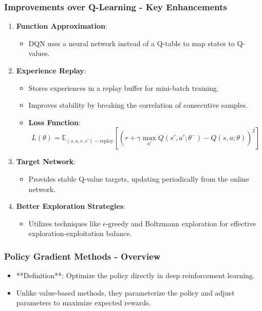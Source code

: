 \documentclass[aspectratio=169]{beamer}
\begin{document}
\begin{frame}[fragile]
    \frametitle{Improvements over Q-Learning - Key Enhancements}
    \begin{enumerate}
        \item \textbf{Function Approximation}:
            \begin{itemize}
                \item DQN uses a neural network instead of a Q-table to map states to Q-values.
            \end{itemize}

        \item \textbf{Experience Replay}:
            \begin{itemize}
                \item Stores experiences in a replay buffer for mini-batch training.
                \item Improves stability by breaking the correlation of consecutive samples.
                \item \textbf{Loss Function}:
                \begin{equation}
                    L(\theta) = \mathbb{E}_{(s, a, r, s') \sim \text{replay}} \left[ (r + \gamma \max_{a'} Q(s', a'; \theta^{-}) - Q(s, a; \theta))^2 \right]
                \end{equation}
            \end{itemize}

        \item \textbf{Target Network}:
            \begin{itemize}
                \item Provides stable Q-value targets, updating periodically from the online network.
            \end{itemize}

        \item \textbf{Better Exploration Strategies}:
            \begin{itemize}
                \item Utilizes techniques like $\epsilon$-greedy and Boltzmann exploration for effective exploration-exploitation balance.
            \end{itemize}
    \end{enumerate}
\end{frame}

\begin{frame}[fragile]
    \frametitle{Policy Gradient Methods - Overview}
    \begin{itemize}
        \item **Definition**: Optimize the policy directly in deep reinforcement learning.
        \item Unlike value-based methods, they parameterize the policy and adjust parameters to maximize expected rewards.
    \end{itemize}
\end{frame}
\end{document}
